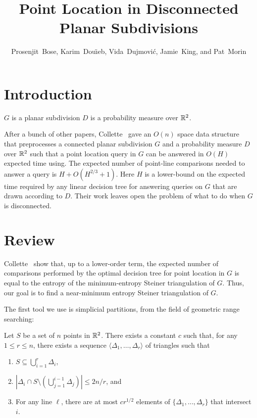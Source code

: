 \documentclass{patmorin}
\title{Point Location in Disconnected Planar Subdivisions}
\author{Prosenjit~Bose, 
	Karim~Dou\"{\i}eb, 
	Vida~Dujmovi\'c, 
	Jamie~King, and 
	Pat~Morin}
\begin{document}
\maketitle

\section{Introduction}

$G$ is a planar subdivision $D$ is a probability measure over $\mathbb{R}^2$.

After a bunch of other papers, Collette \etal\ gave an $O(n)$ space data
structure that preprocesses a connected planar subdivision $G$ and a
probability measure $D$ over $\mathbb{R}^2$ such that a point location query in
$G$ can be answered in $O(H)$ expected time using.  The expected number
of point-line comparisons needed to answer a query is $H + O(H^{2/3}+1)$.
Here $H$ is a lower-bound on the expected time required by any linear
decision tree for answering queries on $G$ that are drawn according
to $D$. Their work leaves open the problem of what to do when $G$
is disconnected.


\section{Review}

Collette \etal\ show that, up to a lower-order term, the expected
number of comparisons performed by the optimal decision tree for point
location in $G$ is equal to the entropy of the minimum-entropy Steiner
triangulation of $G$.  Thus, our goal is to find a near-minimum entropy
Steiner triangulation of $G$.

The first tool we use is simplicial partitions, from the field of geometric
range searching: 

\begin{thm}[Matou\v{s}ek 1991]
Let $S$ be a set of $n$ points in $\mathbb{R}^2$. There exists a constant
$c$ such that, for any $1\le r \le n$, there exists a sequence
$\langle \Delta_1,\ldots,\Delta_r\rangle$ of triangles such that
  \begin{enumerate}
    \item $S\subseteq \bigcup_{i=1}^r \Delta_i$,
  
    \item $\left|\Delta_i \cap S\setminus
    \left(\bigcup_{j=1}^{i-1}\Delta_j\right)\right| \le 2n/r$, and
  
    \item For any line $\ell$, there are at most $cr^{1/2}$ elements of
  $\{\Delta_1,\ldots,\Delta_r\}$ that intersect $i$.
  \end{enumerate}
\end{thm}
\end{document}
